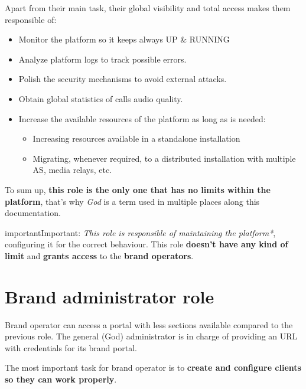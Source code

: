 \documentclass[letterpaper,10pt,english]{sphinxmanual}
\begin{document}
Apart from their main task, their global visibility and total access
makes them responsible of:
\begin{itemize}
\item {} 
Monitor the platform so it keeps always UP \& RUNNING

\item {} 
Analyze platform logs to track possible errors.

\item {} 
Polish the security mechanisms to avoid external attacks.

\item {} 
Obtain global statistics of calls audio quality.

\item {} 
Increase the available resources of the platform as long as is needed:
\begin{itemize}
\item {} 
Increasing resources available in a standalone installation

\item {} 
Migrating, whenever required, to a distributed installation with multiple
AS, media relays, etc.

\end{itemize}

\end{itemize}

To sum up, \textbf{this role is the only one that has no limits within the
platform}, that's why \emph{God} is a term used in multiple places along this
documentation.

\begin{notice}{important}{Important:}
\emph{This role is responsible of maintaining the platform*}, configuring
it for the correct behaviour. This role \textbf{doesn't have any kind
of limit} and \textbf{grants access} to the \textbf{brand operators}.
\end{notice}


\section{Brand administrator role}
\label{basic_concepts/operation_roles/index:brand-administrator-role}
Brand operator can access a portal with less sections available compared
to the previous role. The general (God) administrator is in charge of
providing an URL with credentials for its brand portal.

The most important task for brand operator is to \textbf{create and configure
clients so they can work properly}.
\end{document}
